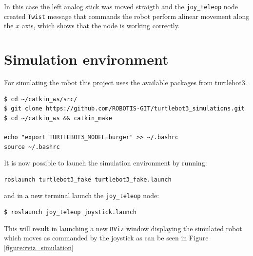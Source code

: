 In this case the left analog stick was moved straigth and the \texttt{joy_teleop} node created \texttt{Twist} message that commands the robot perform alinear movement along the $x$ axis, which shows that the node is working correctly.

\section{Simulation environment}
\noindent For simulating the robot this project uses the available packages from turtlebot3\cite{web_turtlebot3_simulation}.

\begin{mdframed}[backgroundcolor=light-gray, linecolor=light-gray]
\begin{verbatim}
$ cd ~/catkin_ws/src/
$ git clone https://github.com/ROBOTIS-GIT/turtlebot3_simulations.git
$ cd ~/catkin_ws && catkin_make

echo "export TURTLEBOT3_MODEL=burger" >> ~/.bashrc
source ~/.bashrc
\end{verbatim}
\end{mdframed}

\noindent It is now possible to launch the simulation environment by running:
\begin{mdframed}[backgroundcolor=light-gray, linecolor=light-gray]
\begin{verbatim}
roslaunch turtlebot3_fake turtlebot3_fake.launch
\end{verbatim}
\end{mdframed}

\noindent and in a new terminal launch the \texttt{joy\_teleop} node:

\begin{mdframed}[backgroundcolor=light-gray, linecolor=light-gray]
\begin{verbatim}
$ roslaunch joy_teleop joystick.launch
\end{verbatim}
\end{mdframed}

\noindent This will result in launching a new \texttt{RViz} window displaying the simulated robot which moves as commanded by the joystick as can be seen in Figure \ref{figure:rviz_simulation}

